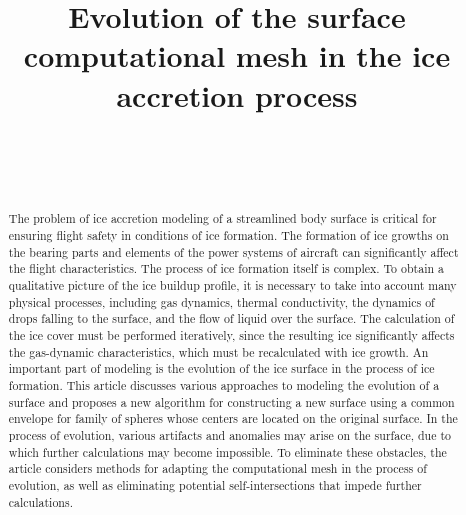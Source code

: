 \documentclass[
11pt,
tightenlines,
twoside,
onecolumn,
nofloats,
nobibnotes,
nofootinbib,
superscriptaddress,
noshowpacs,
centertags]
{revtex4}
\begin{document}

\title{Evolution of the surface computational mesh in the ice accretion process}

\author{~}

\author{~}



\begin{abstract}
The problem of ice accretion modeling of a streamlined body surface is critical for ensuring flight safety in conditions of ice formation.
The formation of ice growths on the bearing parts and elements of the power systems of aircraft can significantly affect the flight characteristics.
The process of ice formation itself is complex.
To obtain a qualitative picture of the ice buildup profile, it is necessary to take into account many physical processes, including gas dynamics, thermal conductivity, the dynamics of drops falling to the surface, and the flow of liquid over the surface.
The calculation of the ice cover must be performed iteratively, since the resulting ice significantly affects the gas-dynamic characteristics, which must be recalculated with ice growth.
An important part of modeling is the evolution of the ice surface in the process of ice formation.
This article discusses various approaches to modeling the evolution of a surface and proposes a new algorithm for constructing a new surface using a common envelope for family of spheres whose centers are located on the original surface.
In the process of evolution, various artifacts and anomalies may arise on the surface, due to which further calculations may become impossible.
To eliminate these obstacles, the article considers methods for adapting the computational mesh in the process of evolution, as well as eliminating potential self-intersections that impede further calculations.
\end{abstract}
\end{document}
